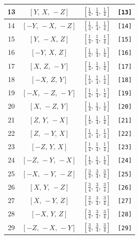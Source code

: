 \documentclass[fleqn,8pt]{jsarticle}
\begin{document}
\begin{longtable}{cccc}
13 & $\left[ Y,\, X,\, - Z \right]$ & $\left[ \frac{1}{4},\, \frac{1}{4},\, \frac{1}{4} \right]$ & {\tt [13]} \\ \hline
14 & $\left[ - Y,\, - X,\, - Z \right]$ & $\left[ \frac{1}{4},\, \frac{1}{4},\, \frac{1}{4} \right]$ & {\tt [14]} \\ \hline
15 & $\left[ Y,\, - X,\, Z \right]$ & $\left[ \frac{1}{4},\, \frac{1}{4},\, \frac{1}{4} \right]$ & {\tt [15]} \\ \hline
16 & $\left[ - Y,\, X,\, Z \right]$ & $\left[ \frac{1}{4},\, \frac{1}{4},\, \frac{1}{4} \right]$ & {\tt [16]} \\ \hline
17 & $\left[ X,\, Z,\, - Y \right]$ & $\left[ \frac{1}{4},\, \frac{1}{4},\, \frac{1}{4} \right]$ & {\tt [17]} \\ \hline
18 & $\left[ - X,\, Z,\, Y \right]$ & $\left[ \frac{1}{4},\, \frac{1}{4},\, \frac{1}{4} \right]$ & {\tt [18]} \\ \hline
19 & $\left[ - X,\, - Z,\, - Y \right]$ & $\left[ \frac{1}{4},\, \frac{1}{4},\, \frac{1}{4} \right]$ & {\tt [19]} \\ \hline
20 & $\left[ X,\, - Z,\, Y \right]$ & $\left[ \frac{1}{4},\, \frac{1}{4},\, \frac{1}{4} \right]$ & {\tt [20]} \\ \hline
21 & $\left[ Z,\, Y,\, - X \right]$ & $\left[ \frac{1}{4},\, \frac{1}{4},\, \frac{1}{4} \right]$ & {\tt [21]} \\ \hline
22 & $\left[ Z,\, - Y,\, X \right]$ & $\left[ \frac{1}{4},\, \frac{1}{4},\, \frac{1}{4} \right]$ & {\tt [22]} \\ \hline
23 & $\left[ - Z,\, Y,\, X \right]$ & $\left[ \frac{1}{4},\, \frac{1}{4},\, \frac{1}{4} \right]$ & {\tt [23]} \\ \hline
24 & $\left[ - Z,\, - Y,\, - X \right]$ & $\left[ \frac{1}{4},\, \frac{1}{4},\, \frac{1}{4} \right]$ & {\tt [24]} \\ \hline
25 & $\left[ - X,\, - Y,\, - Z \right]$ & $\left[ \frac{3}{4},\, \frac{3}{4},\, \frac{3}{4} \right]$ & {\tt [25]} \\ \hline
26 & $\left[ X,\, Y,\, - Z \right]$ & $\left[ \frac{3}{4},\, \frac{3}{4},\, \frac{3}{4} \right]$ & {\tt [26]} \\ \hline
27 & $\left[ X,\, - Y,\, Z \right]$ & $\left[ \frac{3}{4},\, \frac{3}{4},\, \frac{3}{4} \right]$ & {\tt [27]} \\ \hline
28 & $\left[ - X,\, Y,\, Z \right]$ & $\left[ \frac{3}{4},\, \frac{3}{4},\, \frac{3}{4} \right]$ & {\tt [28]} \\ \hline
29 & $\left[ - Z,\, - X,\, - Y \right]$ & $\left[ \frac{3}{4},\, \frac{3}{4},\, \frac{3}{4} \right]$ & {\tt [29]} \\ \hline

\end{longtable}
\end{document}
